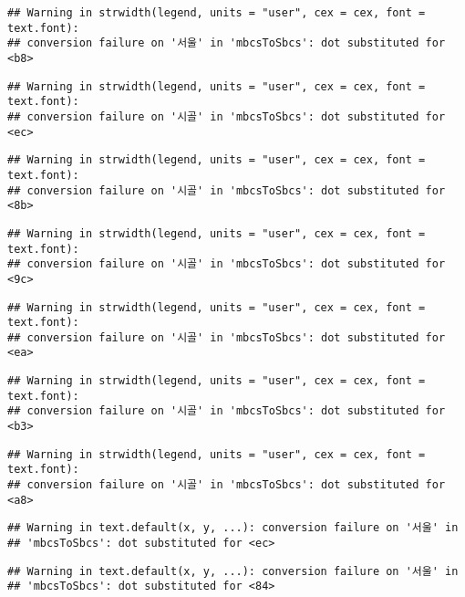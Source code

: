 \documentclass[
]{article}
\begin{document}
\begin{verbatim}
## Warning in strwidth(legend, units = "user", cex = cex, font = text.font):
## conversion failure on '서울' in 'mbcsToSbcs': dot substituted for <b8>
\end{verbatim}

\begin{verbatim}
## Warning in strwidth(legend, units = "user", cex = cex, font = text.font):
## conversion failure on '시골' in 'mbcsToSbcs': dot substituted for <ec>
\end{verbatim}

\begin{verbatim}
## Warning in strwidth(legend, units = "user", cex = cex, font = text.font):
## conversion failure on '시골' in 'mbcsToSbcs': dot substituted for <8b>
\end{verbatim}

\begin{verbatim}
## Warning in strwidth(legend, units = "user", cex = cex, font = text.font):
## conversion failure on '시골' in 'mbcsToSbcs': dot substituted for <9c>
\end{verbatim}

\begin{verbatim}
## Warning in strwidth(legend, units = "user", cex = cex, font = text.font):
## conversion failure on '시골' in 'mbcsToSbcs': dot substituted for <ea>
\end{verbatim}

\begin{verbatim}
## Warning in strwidth(legend, units = "user", cex = cex, font = text.font):
## conversion failure on '시골' in 'mbcsToSbcs': dot substituted for <b3>
\end{verbatim}

\begin{verbatim}
## Warning in strwidth(legend, units = "user", cex = cex, font = text.font):
## conversion failure on '시골' in 'mbcsToSbcs': dot substituted for <a8>
\end{verbatim}

\begin{verbatim}
## Warning in text.default(x, y, ...): conversion failure on '서울' in
## 'mbcsToSbcs': dot substituted for <ec>
\end{verbatim}

\begin{verbatim}
## Warning in text.default(x, y, ...): conversion failure on '서울' in
## 'mbcsToSbcs': dot substituted for <84>
\end{verbatim}
\end{document}
